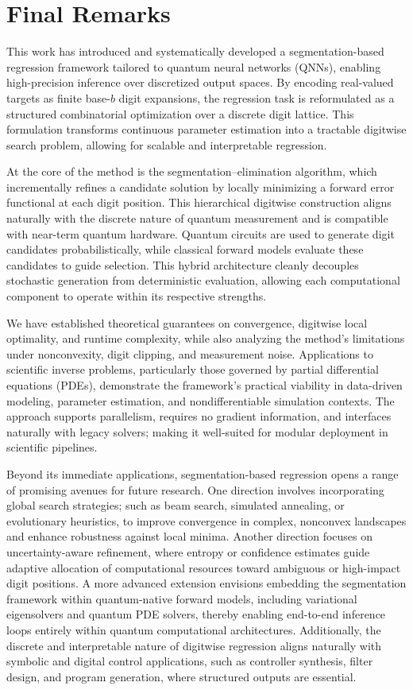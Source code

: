 \documentclass[aps,twocolumn,superscriptaddress,nofootinbib]{revtex4}
\begin{document}
\section*{Final Remarks}
This work has introduced and systematically developed a segmentation-based regression framework tailored to quantum neural networks (QNNs), enabling high-precision inference over discretized output spaces. By encoding real-valued targets as finite base-$b$ digit expansions, the regression task is reformulated as a structured combinatorial optimization over a discrete digit lattice. This formulation transforms continuous parameter estimation into a tractable digitwise search problem, allowing for scalable and interpretable regression.

At the core of the method is the segmentation--elimination algorithm, which incrementally refines a candidate solution by locally minimizing a forward error functional at each digit position. This hierarchical digitwise construction aligns naturally with the discrete nature of quantum measurement and is compatible with near-term quantum hardware. Quantum circuits are used to generate digit candidates probabilistically, while classical forward models evaluate these candidates to guide selection. This hybrid architecture cleanly decouples stochastic generation from deterministic evaluation, allowing each computational component to operate within its respective strengths.

We have established theoretical guarantees on convergence, digitwise local optimality, and runtime complexity, while also analyzing the method’s limitations under nonconvexity, digit clipping, and measurement noise. Applications to scientific inverse problems, particularly those governed by partial differential equations (PDEs), demonstrate the framework’s practical viability in data-driven modeling, parameter estimation, and nondifferentiable simulation contexts. The approach supports parallelism, requires no gradient information, and interfaces naturally with legacy solvers; making it well-suited for modular deployment in scientific pipelines.

Beyond its immediate applications, segmentation-based regression opens a range of promising avenues for future research. One direction involves incorporating global search strategies; such as beam search, simulated annealing, or evolutionary heuristics, to improve convergence in complex, nonconvex landscapes and enhance robustness against local minima. Another direction focuses on uncertainty-aware refinement, where entropy or confidence estimates guide adaptive allocation of computational resources toward ambiguous or high-impact digit positions. A more advanced extension envisions embedding the segmentation framework within quantum-native forward models, including variational eigensolvers and quantum PDE solvers, thereby enabling end-to-end inference loops entirely within quantum computational architectures. Additionally, the discrete and interpretable nature of digitwise regression aligns naturally with symbolic and digital control applications, such as controller synthesis, filter design, and program generation, where structured outputs are essential.
\end{document}
